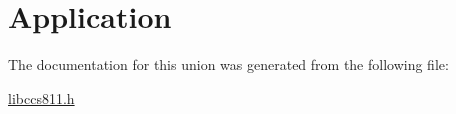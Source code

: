 \hypertarget{union_application}{}\section{Application}
\label{union_application}


The documentation for this union was generated from the following file\+:\begin{DoxyCompactItemize}
\item 
\mbox{\hyperlink{libccs811_8h}{libccs811.\+h}}\end{DoxyCompactItemize}
